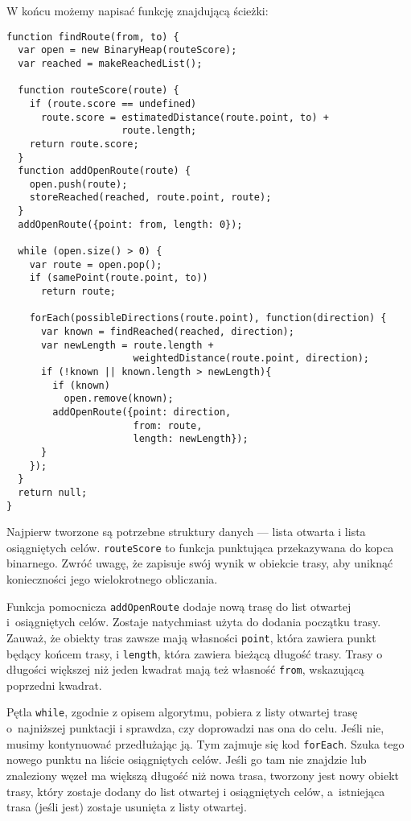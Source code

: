   
W końcu możemy napisać funkcję znajdującą ścieżki:

  
\begin{verbatim} 
function findRoute(from, to) {
  var open = new BinaryHeap(routeScore);
  var reached = makeReachedList();

  function routeScore(route) {
    if (route.score == undefined)
      route.score = estimatedDistance(route.point, to) +
                    route.length;
    return route.score;
  }
  function addOpenRoute(route) {
    open.push(route);
    storeReached(reached, route.point, route);
  }
  addOpenRoute({point: from, length: 0});

  while (open.size() > 0) {
    var route = open.pop();
    if (samePoint(route.point, to))
      return route;
    
    forEach(possibleDirections(route.point), function(direction) {
      var known = findReached(reached, direction);
      var newLength = route.length +
                      weightedDistance(route.point, direction);
      if (!known || known.length > newLength){
        if (known)
          open.remove(known);        
        addOpenRoute({point: direction,
                      from: route,
                      length: newLength});
      }
    });
  }
  return null;
}
 \end{verbatim}
  
Najpierw tworzone są potrzebne struktury danych — lista otwarta i lista osiągniętych celów. \texttt{routeScore} to funkcja punktująca przekazywana do kopca binarnego. Zwróć uwagę, że zapisuje swój wynik w obiekcie trasy, aby uniknąć konieczności jego wielokrotnego obliczania.

  
Funkcja pomocnicza \texttt{addOpenRoute} dodaje nową trasę do list otwartej i~osiągniętych celów. Zostaje natychmiast użyta do dodania początku trasy. Zauważ, że obiekty tras zawsze mają własności \texttt{point}, która zawiera punkt będący końcem trasy, i \texttt{length}, która zawiera bieżącą długość trasy. Trasy o długości większej niż jeden kwadrat mają też własność \texttt{from}, wskazującą poprzedni kwadrat.

  
Pętla \texttt{while}, zgodnie z opisem algorytmu, pobiera z listy otwartej trasę o~najniższej punktacji i sprawdza, czy doprowadzi nas ona do celu. Jeśli nie, musimy kontynuować przedłużając ją. Tym zajmuje się kod \texttt{forEach}. Szuka tego nowego punktu na liście osiągniętych celów. Jeśli go tam nie znajdzie lub znaleziony węzeł ma większą długość niż nowa trasa, tworzony jest nowy obiekt trasy, który zostaje dodany do list otwartej i osiągniętych celów, a~istniejąca trasa (jeśli jest) zostaje usunięta z listy otwartej.

